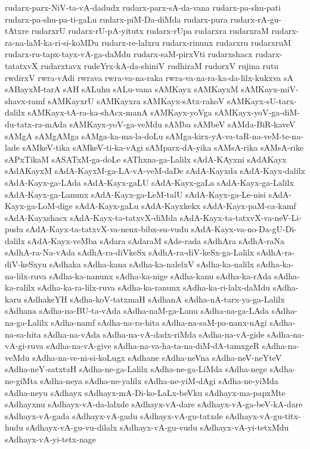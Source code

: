 {rudarx-parx-NiV-ta-vA-dadudx
rudarx-parx-sA-da-vana
rudarx-pa-shu-pati
rudarx-pa-shu-pa-ti-gaLu
rudarx-piM-Da-diMda
rudarx-pura
rudarx-rA-gu-tAtxre
rudarxrU
rudarx-rU-pA-yitutx
rudarx-rUpa
rudarxra
rudarxraM
rudarx-ra-na-laM-ka-ri-si-koMDu
rudarx-re-lalxru
rudarx-rinunx
rudarxru
rudarxruM
rudarx-ru-tapx-tayx-vA-ga-daMdu
rudarx-saM-pirxVti
rudarxshacx
rudarx-tatatxvX
rudarxtavx
rudeYrx-kA-da-shiniV
rudhiraM
rudorxV
rujina
rutu
rwdirxV
rwra-vAdi
rwrava
rwra-va-na-raka
rwra-va-na-ra-ka-da-lilx-kukxva
sA
sABayxM-tarA
sAH
sALuhu
sALu-vana
sAMKayx
sAMKayxM
sAMKayx-miV-shavx-ramf
sAMKayxrU
sAMKayxra
sAMKayx-sAtx-rakoV
sAMKayx-sU-tarx-dalilx
sAMKayx-tA-ra-ka-shAcx-manA
sAMKayx-yoVga
sAMKayx-yoV-ga-diM-du-tatx-ra-mAda
sAMKayx-yoV-ga-veMdu
sAMba
sAMbeV
sAMda-BiR-kaveV
sAMgA
sAMgAMga
sAMga-ka-ma-la-doLu
sAMga-kirx-yA-va-taR-na-veM-te-na-lade
sAMkeV-tika
sAMkeV-ti-ka-vAgi
sAMparx-dA-yika
sAMsA-rika
sAMsA-rike
sAPxTikaM
sASATxM-ga-doLe
sAThxna-ga-Lalilx
sAdA-KAyxni
sAdAKayx
sAdAKayxM
sAdA-KayxM-ga-LA-vA-veM-daDe
sAdA-Kayxda
sAdA-Kayx-dalilx
sAdA-Kayx-ga-LAda
sAdA-Kayx-gaLU
sAdA-Kayx-gaLa
sAdA-Kayx-ga-Lalilx
sAdA-Kayx-ga-Lanunx
sAdA-Kayx-ga-LeM-talU
sAdA-Kayx-ga-Le-nisi
sAdA-Kayx-ga-LoM-dige
sAdA-Kayx-gaLu
sAdA-Kayxkekx
sAdA-Kayx-paM-ca-kamf
sAdA-Kayxshacx
sAdA-Kayx-ta-tatxvX-diMda
sAdA-Kayx-ta-tatxvX-va-neV-Li-pudu
sAdA-Kayx-ta-tatxvX-va-nenx-bibx-su-vudu
sAdA-Kayx-va-no-Da-gU-Di-dalilx
sAdA-Kayx-veMba
sAdara
sAdaraM
sAde-rada
sAdhAra
sAdhA-raNa
sAdhA-ra-Na-vAda
sAdhA-ra-diVkeSx
sAdhA-ra-diV-keSx-ga-Lalilx
sAdhA-ra-diV-keSxyu
sAdhaka
sAdha-kana
sAdha-ka-nalelxV
sAdha-ka-nalilx
sAdha-ka-na-lilx-ruva
sAdha-ka-nanunx
sAdha-ka-nige
sAdha-kanu
sAdha-ka-rAda
sAdha-ka-ralilx
sAdha-ka-ra-lilx-ruva
sAdha-ka-ranunx
sAdha-ka-ri-lalx-daMdu
sAdha-karu
sAdhakeYH
sAdha-koV-tatxmaH
sAdhanA
sAdha-nA-tarx-ya-ga-Lalilx
sAdhana
sAdha-na-BU-ta-vAda
sAdha-naM-ga-Lanu
sAdha-na-ga-LAda
sAdha-na-ga-Lalilx
sAdha-namf
sAdha-na-ra-hita
sAdha-na-saM-pa-nanx-nAgi
sAdha-na-sa-hita
sAdha-na-vAda
sAdha-na-vA-dadx-riMda
sAdha-na-vA-gide
sAdha-na-vA-gi-ruva
sAdha-na-vA-give
sAdha-na-va-ha-ta-na-diM-dA-tamxgeR
sAdha-na-veMdu
sAdha-na-ve-ni-si-koLugx
sAdhane
sAdha-neVna
sAdha-neV-neYteV
sAdha-neY-satxtaH
sAdha-ne-ga-Lalilx
sAdha-ne-ga-LiMda
sAdha-nege
sAdha-ne-giMta
sAdha-neya
sAdha-ne-yalilx
sAdha-ne-yiM-dAgi
sAdha-ne-yiMda
sAdha-neyu
sAdhayx
sAdhayx-mA-Di-ko-LaLx-beVku
sAdhayx-ma-papxMte
sAdhayxnu
sAdhayx-vA-da-lalxde
sAdhayx-vA-dare
sAdhayx-vA-ga-beV-kA-dare
sAdhayx-vA-gada
sAdhayx-vA-gadu
sAdhayx-vA-gu-tatxde
sAdhayx-vA-gu-titx-hudu
sAdhayx-vA-gu-vu-dilalx
sAdhayx-vA-gu-vudu
sAdhayx-vA-yi-tetxMdu
sAdhayx-vA-yi-tetx-nage
}
